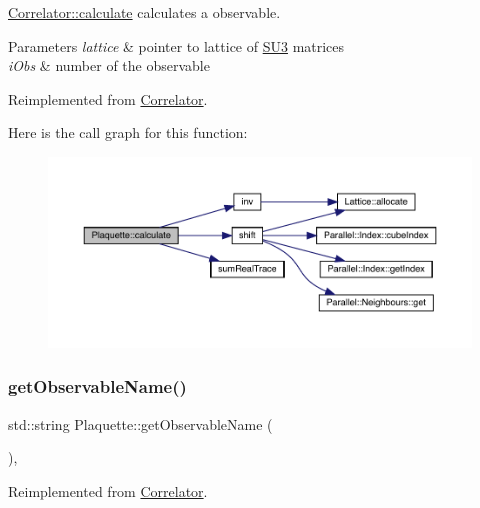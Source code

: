 \mbox{\hyperlink{class_correlator_ab33502ff305f891c5c2e6d66a26a0247}{Correlator\+::calculate}} calculates a observable. 


\begin{DoxyParams}{Parameters}
{\em lattice} & pointer to lattice of \mbox{\hyperlink{class_s_u3}{S\+U3}} matrices \\
\hline
{\em i\+Obs} & number of the observable \\
\hline
\end{DoxyParams}


Reimplemented from \mbox{\hyperlink{class_correlator_ab33502ff305f891c5c2e6d66a26a0247}{Correlator}}.

Here is the call graph for this function\+:\nopagebreak
\begin{figure}[H]
\begin{center}
\leavevmode
\includegraphics[width=350pt]{class_plaquette_a40cae6fd587c14836bdf61e69c615a00_cgraph}
\end{center}
\end{figure}
\mbox{\label{class_plaquette_a86de9d267ae1bc6a8c6d3335837ea683}} 
\subsubsection{\texorpdfstring{getObservableName()}{getObservableName()}}
{\footnotesize\ttfamily std\+::string Plaquette\+::get\+Observable\+Name (\begin{DoxyParamCaption}{ }\end{DoxyParamCaption})\hspace{0.3cm}{\ttfamily [inline]}, {\ttfamily [virtual]}}



Reimplemented from \mbox{\hyperlink{class_correlator_ad1fa59e864917c3e48da037f90c3488f}{Correlator}}.

